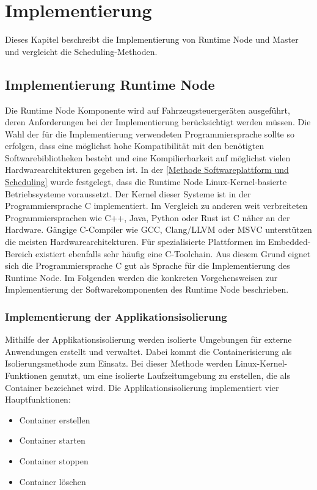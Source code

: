 \chapter{Implementierung}

Dieses Kapitel beschreibt die Implementierung von Runtime Node und Master und vergleicht die Scheduling-Methoden.

\section{Implementierung Runtime Node}

Die Runtime Node Komponente wird auf Fahrzeugsteuergeräten ausgeführt, deren Anforderungen bei der Implementierung berücksichtigt werden müssen. Die Wahl der für die Implementierung verwendeten Programmiersprache sollte so erfolgen, dass eine möglichst hohe Kompatibilität mit den benötigten Softwarebibliotheken besteht und eine Kompilierbarkeit auf möglichst vielen Hardwarearchitekturen gegeben ist. In der \autoref{Methode Softwareplattform und Scheduling} wurde festgelegt, dass die Runtime Node Linux-Kernel-basierte Betriebssysteme voraussetzt. Der Kernel dieser Systeme ist in der Programmiersprache C implementiert. Im Vergleich zu anderen weit verbreiteten Programmiersprachen wie C++, Java, Python oder Rust ist C näher an der Hardware. Gängige C-Compiler wie GCC, Clang/LLVM oder MSVC unterstützen die meisten Hardwarearchitekturen. Für spezialisierte Plattformen im Embedded-Bereich existiert ebenfalls sehr häufig eine C-Toolchain. Aus diesem Grund eignet sich die Programmiersprache C gut als Sprache für die Implementierung des Runtime Node. Im Folgenden werden die konkreten Vorgehensweisen zur Implementierung der Softwarekomponenten des Runtime Node beschrieben.

\subsection{Implementierung der Applikationsisolierung}

Mithilfe der Applikationsisolierung werden isolierte Umgebungen für externe Anwendungen erstellt und verwaltet. Dabei kommt die Containerisierung als Isolierungsmethode zum Einsatz. Bei dieser Methode werden Linux-Kernel-Funktionen genutzt, um eine isolierte Laufzeitumgebung zu erstellen, die als Container bezeichnet wird. Die Applikationsisolierung implementiert vier Hauptfunktionen:

\begin{itemize}
    \item Container erstellen
    \item Container starten
    \item Container stoppen
    \item Container löschen
\end{itemize}


